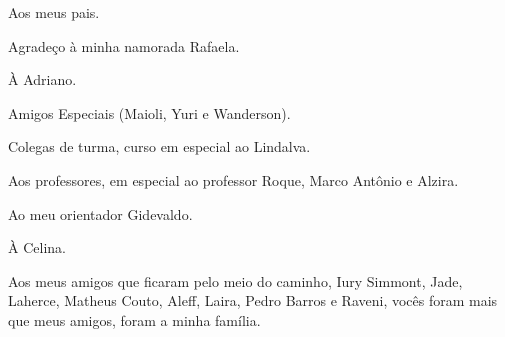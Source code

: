 \begin{agradecimentos}

  Aos meus pais. 

  Agradeço à minha namorada Rafaela.
  
  À Adriano.

  Amigos Especiais (Maioli, Yuri e Wanderson).

  Colegas de turma, curso em especial ao Lindalva.

  Aos professores, em especial ao professor Roque, Marco Antônio e Alzira.

  Ao meu orientador Gidevaldo.

  À Celina.

  Aos meus amigos que ficaram pelo meio do caminho, Iury Simmont, Jade, Laherce, Matheus Couto, Aleff, Laira, Pedro Barros e Raveni, vocês foram mais que meus amigos, foram a minha família. 
\end{agradecimentos}
